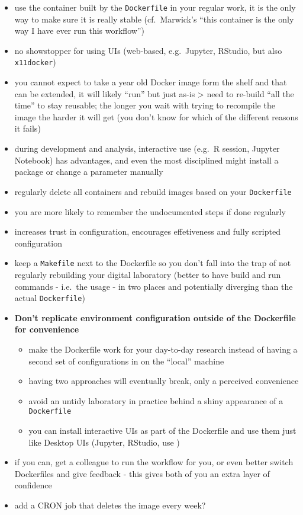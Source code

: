 \documentclass[10pt,letterpaper]{article}
\providecommand{\tightlist}{%
  \setlength{\itemsep}{0pt}\setlength{\parskip}{0pt}}
\begin{document}
\begin{itemize}
\tightlist
\item
  use the container built by the \texttt{Dockerfile} in your regular
  work, it is the only way to make sure it is really stable
  (cf.~Marwick's ``this container is the only way I have ever run this
  workflow'')
\item
  no showstopper for using UIs (web-based, e.g.~Jupyter, RStudio, but
  also \texttt{x11docker})
\item
  you cannot expect to take a year old Docker image form the shelf and
  that can be extended, it will likely ``run'' but just as-is
  \textgreater{} need to re-build ``all the time'' to stay reusable; the
  longer you wait with trying to recompile the image the harder it will
  get (you don't know for which of the different reasons it fails)
\item
  during development and analysis, interactive use (e.g.~R session,
  Jupyter Notebook) has advantages, and even the most disciplined might
  install a package or change a parameter manually
\item
  regularly delete all containers and rebuild images based on your
  \texttt{Dockerfile}
\item
  you are more likely to remember the undocumented steps if done
  regularly
\item
  increases trust in configuration, encourages effetiveness and fully
  scripted configuration
\item
  keep a \texttt{Makefile} next to the Dockerfile so you don't fall into
  the trap of not regularly rebuilding your digital laboratory (better
  to have build and run commands - i.e.~the usage - in two places and
  potentially diverging than the actual \texttt{Dockerfile})
\item
  \textbf{Don't replicate environment configuration outside of the
  Dockerfile for convenience}

  \begin{itemize}
  \tightlist
  \item
    make the Dockerfile work for your day-to-day research instead of
    having a second set of configurations in on the ``local'' machine
  \item
    having two approaches will eventually break, only a perceived
    convenience
  \item
    avoid an untidy laboratory in practice behind a shiny appearance of
    a \texttt{Dockerfile}
  \item
    you can install interactive UIs as part of the Dockerfile and use
    them just like Desktop UIs (Jupyter, RStudio, use )
  \end{itemize}
\item
  if you can, get a colleague to run the workflow for you, or even
  better switch Dockerfiles and give feedback - this gives both of you
  an extra layer of confidence
\item
  add a CRON job that deletes the image every week?
\end{itemize}
\end{document}
